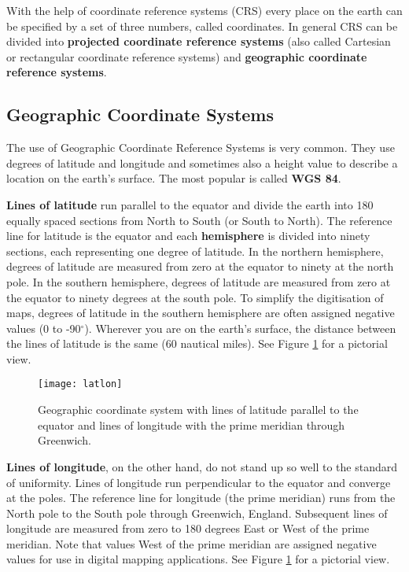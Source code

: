 With the help of coordinate reference systems (CRS) every place on the earth
can be specified by a set of three numbers, called coordinates. In general
CRS can be divided into \textbf{projected coordinate reference systems} (also
called Cartesian or rectangular coordinate reference systems) and
\textbf{geographic coordinate reference systems}. 

\subsection{Geographic Coordinate Systems}

The use of Geographic Coordinate Reference Systems is very common. They use
degrees of latitude and longitude and sometimes also a height value to
describe a location on the earth's surface. The most popular is called
\textbf{WGS 84}.

\textbf{Lines of latitude} run parallel to the equator and divide the earth into 180
equally spaced sections from North to South (or South to North). The
reference line for latitude is the equator and each \textbf{hemisphere} is
divided
into ninety sections, each representing one degree of latitude. In the
northern hemisphere, degrees of latitude are measured from zero at the
equator to ninety at the north pole. In the southern hemisphere, degrees of
latitude are measured from zero at the equator to ninety degrees at the south
pole. To simplify the digitisation of maps, degrees of latitude in the
southern hemisphere are often assigned negative values (0 to -90$^\circ$). Wherever
you are on the earth's surface, the distance between the lines of latitude is
the same (60 nautical miles). See Figure \ref{fig:latlon} for a pictorial view.

\begin{figure}[ht]
   \begin{center}
   \caption{Geographic coordinate system with lines of latitude parallel to
the equator and lines of longitude with the prime meridian through Greenwich.}
\label{fig:latlon}\smallskip
   \texttt{[image: latlon]}
\end{center}
\end{figure}

\textbf{Lines of longitude}, on the other hand, do not stand up so well to the
standard of uniformity. Lines of longitude run perpendicular to the equator
and converge at the poles. The reference line for longitude (the prime
meridian) runs from the North pole to the South pole through Greenwich,
England. Subsequent lines of longitude are measured from zero to 180 degrees
East or West of the prime meridian. Note that values West of the prime
meridian are assigned negative values for use in digital mapping
applications. See Figure \ref{fig:latlon} for a pictorial view.

